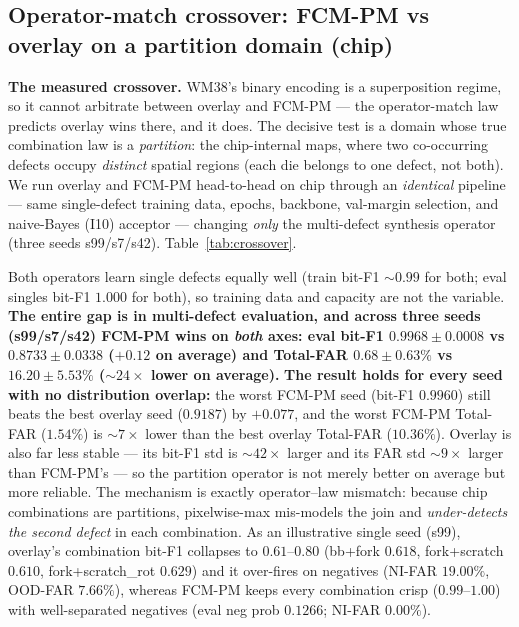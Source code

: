 \documentclass[11pt]{article}
\begin{document}
\subsection{Operator-match crossover: FCM-PM vs overlay on a partition domain (chip)}\label{sec:crossover}
\textbf{The measured crossover.} WM38's binary encoding is a superposition regime, so
it cannot arbitrate between overlay and FCM-PM --- the operator-match law predicts
overlay wins there, and it does. The decisive test is a domain whose true combination
law is a \emph{partition}: the chip-internal maps, where two co-occurring defects
occupy \emph{distinct} spatial regions (each die belongs to one defect, not both). We
run overlay and FCM-PM head-to-head on chip through an \emph{identical} pipeline ---
same single-defect training data, epochs, backbone, val-margin selection, and
naive-Bayes (I10) acceptor --- changing \emph{only} the multi-defect synthesis operator
(three seeds s99/s7/s42). Table~\ref{tab:crossover}.

Both operators learn single defects equally well (train bit-F1 ${\sim}0.99$ for both;
eval singles bit-F1 $1.000$ for both), so training data and capacity are not the
variable. \textbf{The entire gap is in multi-defect evaluation, and across three seeds
(s99/s7/s42) FCM-PM wins on \emph{both} axes: eval bit-F1 $0.9968 \pm 0.0008$ vs
$0.8733 \pm 0.0338$ ($+0.12$ on average) and Total-FAR $0.68 \pm 0.63\%$ vs
$16.20 \pm 5.53\%$ (${\sim}24\times$ lower on average).} \textbf{The result holds for
every seed with no distribution overlap:} the worst FCM-PM seed (bit-F1 $0.9960$) still
beats the best overlay seed ($0.9187$) by $+0.077$, and the worst FCM-PM Total-FAR
($1.54\%$) is ${\sim}7\times$ lower than the best overlay Total-FAR ($10.36\%$). Overlay
is also far less stable --- its bit-F1 std is ${\sim}42\times$ larger and its FAR std
${\sim}9\times$ larger than FCM-PM's --- so the partition operator is not merely better
on average but more reliable. The mechanism is exactly operator--law mismatch: because
chip combinations are partitions, pixelwise-max mis-models the join and
\emph{under-detects the second defect} in each combination. As an illustrative single
seed (s99), overlay's combination bit-F1 collapses to $0.61$--$0.80$ (bb+fork $0.618$,
fork+scratch $0.610$, fork+scratch\_rot $0.629$) and it over-fires on negatives (NI-FAR
$19.00\%$, OOD-FAR $7.66\%$), whereas FCM-PM keeps every combination crisp
($0.99$--$1.00$) with well-separated negatives (eval neg prob $0.1266$; NI-FAR
$0.00\%$).
\end{document}
